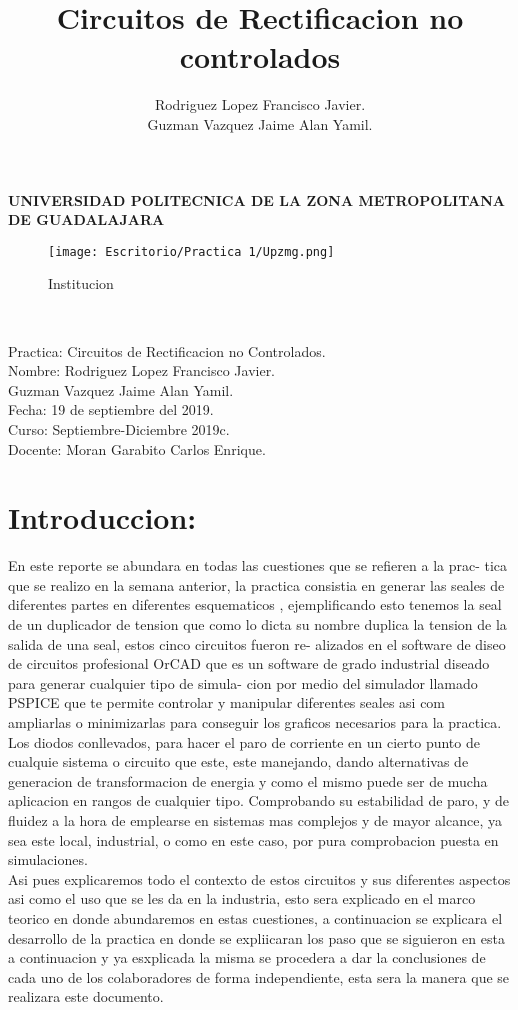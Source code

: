 \documentclass[11pt,a4paper]{article}
\author{Rodriguez Lopez Francisco Javier.\\Guzman Vazquez Jaime Alan Yamil.}
\title{Circuitos de Rectificacion no controlados}
\begin{document}
\begin{center}
\textbf{UNIVERSIDAD POLITECNICA DE LA ZONA METROPOLITANA DE GUADALAJARA}\\

\begin{figure}[hbtp]
\centering
\texttt{[image: Escritorio/Practica 1/Upzmg.png]}
\caption{Institucion}
\end{figure}\\
\end{center}

Practica: Circuitos de Rectificacion no Controlados.\\
Nombre: Rodriguez Lopez Francisco Javier.\\
                  Guzman Vazquez Jaime Alan Yamil.\\
Fecha: 19 de septiembre del 2019.\\
Curso: Septiembre-Diciembre 2019c.\\
Docente: Moran Garabito Carlos Enrique.\\


\newpage
\section{Introduccion:}
En este reporte se abundara en todas las cuestiones que se refieren a la prac-
tica que se realizo en la semana anterior, la practica consistia en generar las
seales de diferentes partes en diferentes esquematicos , ejemplificando esto
tenemos la seal de un duplicador de tension que como lo dicta su nombre
duplica la tension de la salida de una seal, estos cinco circuitos fueron re-
alizados en el software de diseo de circuitos profesional OrCAD que es un
software de grado industrial diseado para generar cualquier tipo de simula-
cion por medio del simulador llamado PSPICE que te permite controlar y
manipular diferentes seales asi com ampliarlas o minimizarlas para conseguir
los graficos necesarios para la practica.\\
Los diodos conllevados, para hacer el paro de corriente en un cierto punto de cualquie sistema o circuito que este, este manejando, dando alternativas de generacion de transformacion de energia y como el mismo puede ser de mucha aplicacion en rangos de cualquier tipo. Comprobando su estabilidad de paro, y de fluidez a la hora de emplearse en sistemas mas complejos y de mayor alcance, ya sea este local, industrial, o como en este caso, por pura comprobacion puesta en simulaciones.\\
Asi pues explicaremos todo el contexto de estos circuitos y sus diferentes
aspectos asi como el uso que se les da en la industria, esto sera explicado en
el marco teorico en donde abundaremos en estas cuestiones, a continuacion
se explicara el desarrollo de la practica en donde se expliicaran los paso que
se siguieron en esta a continuacion y ya esxplicada la misma se procedera a
dar la conclusiones de cada uno de los colaboradores de forma independiente,
esta sera la manera que se realizara este documento.\\
\end{document}
